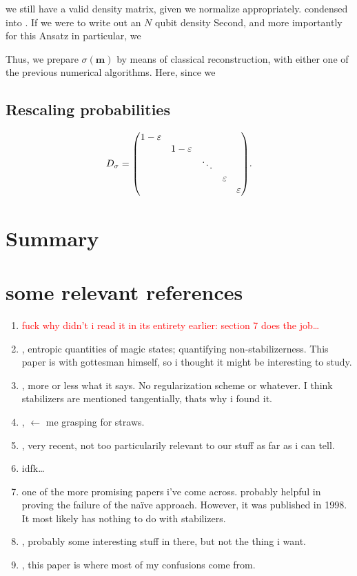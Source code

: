 we still have a valid density matrix, given we normalize appropriately. 
condensed into . If we were to write out an $N$ qubit
density 
Second, and more importantly for this Ansatz in particular, we

Thus, we prepare $\sigma(\mathbf{m})$ by means of classical reconstruction,
with either one of the previous numerical algorithms. Here, since we 
\subsection{Rescaling probabilities}
\begin{align}
  D_\sigma = \mqty(\dmat{1-\varepsilon,1-\varepsilon,\ddots,\varepsilon,\varepsilon})
.\end{align}
\section{Summary}

\clearpage
\section{some relevant references}
\begin{enumerate}
  \item \textcolor{red}{
      fuck why didn't i read it in its entirety earlier: section 7 does the
    job\ldots}
  \item {}, entropic quantities of
    magic states; quantifying non-stabilizerness. This paper is with gottesman
    himself, so i thought it might be interesting to study. 
  \item {}, more or less what
    it says. No regularization scheme or whatever. I think stabilizers are
    mentioned tangentially, thats why i found it.
  \item {}, $\leftarrow$ me
    grasping for straws.
  \item {}, very recent, not too
    particularily relevant to our stuff as far as i can tell.
  \item {} idfk\ldots
  \item {} one of the more
    promising papers i've come across. probably helpful in proving the failure
    of the na\"ive approach. However, it was published in 1998. It most likely
    has nothing to do with stabilizers.
  \item {}, probably some interesting
    stuff in there, but not the thing i want.
  \item {}, this paper is where most
    of my confusions come from. 
\end{enumerate}
